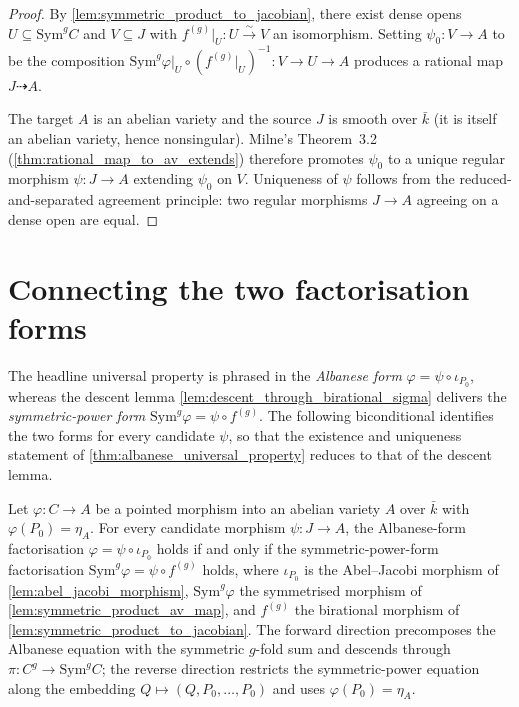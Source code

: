 \begin{proof}
  
  By \cref{lem:symmetric_product_to_jacobian}, there exist dense opens
  \(U \subseteq \mathrm{Sym}^g C\) and \(V \subseteq J\) with \(f^{(g)}|_U \colon
  U \xrightarrow{\sim} V\) an isomorphism. Setting \(\psi_0 \colon V \to A\)
  to be the composition \(\mathrm{Sym}^g \varphi|_U \circ (f^{(g)}|_U)^{-1}
  \colon V \to U \to A\) produces a rational map \(J \dashrightarrow A\).

  The target \(A\) is an abelian variety and the source \(J\) is smooth over
  \(\bar k\) (it is itself an abelian variety, hence nonsingular). Milne's
  Theorem~3.2 (\cref{thm:rational_map_to_av_extends}) therefore promotes
  \(\psi_0\) to a unique regular morphism \(\psi \colon J \to A\) extending
  \(\psi_0\) on \(V\). Uniqueness of \(\psi\) follows from the
  reduced-and-separated agreement principle: two regular morphisms
  \(J \to A\) agreeing on a dense open are equal.
\end{proof}

\section{Connecting the two factorisation forms}
\label{sec:albaneseup_connecting}

The headline universal property is phrased in the \emph{Albanese form}
\(\varphi = \psi \circ \iota_{P_0}\), whereas the descent lemma
\cref{lem:descent_through_birational_sigma} delivers the
\emph{symmetric-power form}
\(\mathrm{Sym}^g \varphi = \psi \circ f^{(g)}\). The following biconditional
identifies the two forms for every candidate \(\psi\), so that the existence
and uniqueness statement of \cref{thm:albanese_universal_property} reduces to
that of the descent lemma.

\begin{lemma}
  \label{lem:albanese_eq_iff_symmetricPower_eq}

  Let \(\varphi \colon C \to A\) be a pointed morphism into an abelian variety
  \(A\) over \(\bar k\) with \(\varphi(P_0) = \eta_A\). For every candidate
  morphism \(\psi \colon J \to A\), the Albanese-form factorisation
  \(\varphi = \psi \circ \iota_{P_0}\) holds if and only if the
  symmetric-power-form factorisation
  \(\mathrm{Sym}^g \varphi = \psi \circ f^{(g)}\) holds, where
  \(\iota_{P_0}\) is the Abel--Jacobi morphism of
  \cref{lem:abel_jacobi_morphism}, \(\mathrm{Sym}^g \varphi\) the symmetrised
  morphism of \cref{lem:symmetric_product_av_map}, and \(f^{(g)}\) the
  birational morphism of \cref{lem:symmetric_product_to_jacobian}. The forward
  direction precomposes the Albanese equation with the symmetric \(g\)-fold sum
  and descends through \(\pi \colon C^g \to \mathrm{Sym}^g C\); the reverse
  direction restricts the symmetric-power equation along the embedding
  \(Q \mapsto (Q, P_0, \ldots, P_0)\) and uses \(\varphi(P_0) = \eta_A\).
\end{lemma}

